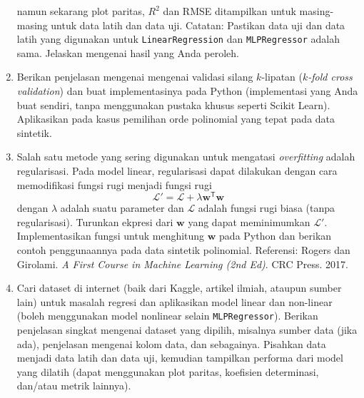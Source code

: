 \documentclass[a4paper,11pt]{article} %
\newcommand{\pyinline}[1]{\texttt{#1}}
\begin{document}
\begin{enumerate}
namun sekarang plot paritas, $R^{2}$ dan RMSE ditampilkan untuk
masing-masing untuk data latih dan data uji.
Catatan: Pastikan data uji dan data latih yang digunakan
untuk \pyinline{LinearRegression} dan \pyinline{MLPRegressor} adalah sama.
Jelaskan mengenai hasil yang Anda peroleh.
%
%
\item Berikan penjelasan mengenai mengenai validasi silang $k$-lipatan
($k$\textit{-fold cross validation})
dan buat implementasinya pada Python (implementasi yang Anda buat sendiri,
tanpa menggunakan pustaka khusus seperti Scikit Learn).
Aplikasikan pada kasus pemilihan orde polinomial yang tepat pada
data sintetik.
%
%
\item Salah satu metode yang sering digunakan untuk mengatasi
\textit{overfitting} adalah regularisasi. Pada model linear, regularisasi
dapat dilakukan dengan cara memodifikasi fungsi rugi menjadi
fungsi rugi
$$
\mathcal{L}' = \mathcal{L} + \lambda \mathbf{w}^{\mathsf{T}}\mathbf{w}
$$
dengan $\lambda$ adalah suatu parameter dan $\mathcal{L}$
adalah fungsi rugi biasa (tanpa regularisasi).
Turunkan ekpresi dari $\mathbf{w}$ yang dapat meminimumkan $\mathcal{L}'$.
Implementasikan fungsi untuk menghitung $\mathbf{w}$ pada Python
dan berikan contoh penggunaannya pada data sintetik polinomial.
Referensi: Rogers dan Girolami.
\textit{A First Course in Machine Learning (2nd Ed)}.
CRC Press. 2017.
%
%
\item Cari dataset di internet (baik dari Kaggle, artikel ilmiah,
ataupun sumber lain) untuk masalah regresi dan aplikasikan model linear
dan non-linear (boleh menggunakan
model nonlinear selain \pyinline{MLPRegressor}). Berikan penjelasan singkat
mengenai dataset yang dipilih, misalnya sumber data (jika ada),
penjelasan mengenai kolom data, dan sebagainya.
Pisahkan data menjadi data latih dan data uji, kemudian tampilkan
performa dari model yang dilatih (dapat menggunakan plot paritas, koefisien
determinasi, dan/atau metrik lainnya). 
\end{enumerate}
\end{document}
